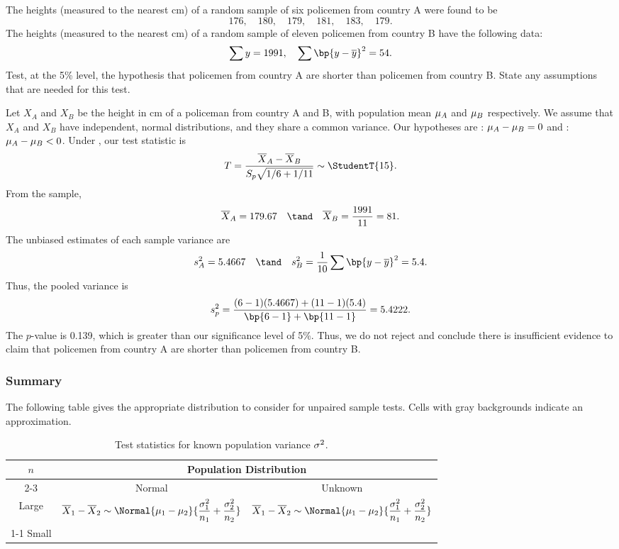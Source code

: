 \begin{sample}
    The heights (measured to the nearest cm) of a random sample of six policemen from country A were found to be \[176, \quad 180, \quad 179, \quad 181, \quad 183, \quad 179.\] The heights (measured to the nearest cm) of a random sample of eleven policemen from country B have the following data: \[\sum y = 1991, \quad \sum \bp{y - \ol{y}}^2 = 54.\] Test, at the 5\% level, the hypothesis that policemen from country A are shorter than policemen from country B. State any assumptions that are needed for this test.
\end{sample}
\begin{sampans}
    Let $X_A$ and $X_B$ be the height in cm of a policeman from country A and B, with population mean $\mu_A$ and $\mu_B$ respectively. We assume that $X_A$ and $X_B$ have independent, normal distributions, and they share a common variance. Our hypotheses are \nullhyp: $\mu_A - \mu_B = 0$ and \althyp: $\mu_A - \mu_B < 0$. Under \nullhyp, our test statistic is \[T = \frac{\ol{X}_A - \ol{X}_B}{S_p \sqrt{1/6 + 1/11}} \sim \StudentT{15}.\] From the sample, \[\ol{X}_A = 179.67 \quad \tand \quad \ol{X}_B = \frac{1991}{11} = 81.\] The unbiased estimates of each sample variance are \[s_A^2 = 5.4667 \quad \tand \quad s_B^2 = \frac1{10} \sum \bp{y - \ol{y}}^2 = 5.4.\] Thus, the pooled variance is \[s_p^2 = \frac{(6-1)(5.4667) + (11-1)(5.4)}{\bp{6-1} + \bp{11-1}} = 5.4222.\] The $p$-value is 0.139, which is greater than our significance level of 5\%. Thus, we do not reject \nullhyp{} and conclude there is insufficient evidence to claim that policemen from country A are shorter than policemen from country B.
\end{sampans}

\subsubsection{Summary}

The following table gives the appropriate distribution to consider for unpaired sample tests. Cells with gray backgrounds indicate an approximation.

\begin{table}[H]
    \centering
    \bgroup
    \def\arraystretch{1.5}
    \begin{tabular}{|c|cc|}
    \hline
    \multirow{2}{*}{$n$} & \multicolumn{2}{c|}{Population Distribution} \\ \cline{2-3} 
    & \multicolumn{1}{c|}{Normal} & Unknown \\ \hline
    Large & \multicolumn{1}{c|}{\multirow{2}{*}{$\displaystyle \ol{X}_1 - \ol{X}_2 \sim \Normal{\m_1 - \m_2}{\frac{\s_1^2}{n_1} + \frac{\s_2^2}{n_2}}$}} & \cellcolor{black!20} $\displaystyle \ol{X}_1 - \ol{X}_2 \sim \Normal{\m_1 - \m_2}{\frac{\s_1^2}{n_1} + \frac{\s_2^2}{n_2}}$ \\ \cline{1-1} \cline{3-3} 
    Small & \multicolumn{1}{c|}{} & \cellcolor{black} \\ \hline
    \end{tabular}
    \egroup
    \caption{Test statistics for known population variance $\sigma^2$.}
\end{table}

